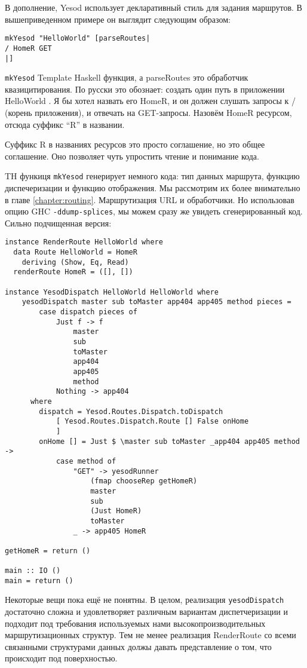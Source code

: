 В дополнение, Yesod использует декларативный стиль для задания маршрутов. 
В вышеприведенном примере он выглядит следующим образом:

\begin{lstlisting}
mkYesod "HelloWorld" [parseRoutes|
/ HomeR GET
|]
\end{lstlisting}

\lstinline'mkYesod' Template Haskell функция, а parseRoutes это 
обработчик квазицитирования. По русски это обознает: создать один 
путь в приложении HelloWorld . Я бы хотел назвать его HomeR, и он 
должен слушать запросы к / (корень приложения), 
и отвечать на GET-запросы. Назовём HomeR ресурсом, отсюда суффикс 
``R'' в названии.

Суффикс R в названиях ресурсов это просто соглашение, но это общее соглашение. 
Оно позволяет чуть упростить чтение и понимание кода.

TH функиця \lstinline'mkYesod' генерирует немного кода: тип данных маршрута, 
функцию диспечеризации и функцию отображения. Мы рассмотрим их более внимательно в главе 
\ref{chapter:routing}. Маршрутизация URL и обработчики.
Но использовав опцию GHC \lstinline'-ddump-splices', мы можем сразу же увидеть 
сгенерированный код. Сильно подчищенная версия:

\begin{lstlisting}
instance RenderRoute HelloWorld where
  data Route HelloWorld = HomeR
    deriving (Show, Eq, Read)
  renderRoute HomeR = ([], [])

instance YesodDispatch HelloWorld HelloWorld where
    yesodDispatch master sub toMaster app404 app405 method pieces =
        case dispatch pieces of
            Just f -> f
                master
                sub
                toMaster
                app404
                app405
                method
            Nothing -> app404
      where
        dispatch = Yesod.Routes.Dispatch.toDispatch
            [ Yesod.Routes.Dispatch.Route [] False onHome
            ]
        onHome [] = Just $ \master sub toMaster _app404 app405 method ->
            case method of
                "GET" -> yesodRunner
                    (fmap chooseRep getHomeR)
                    master
                    sub
                    (Just HomeR)
                    toMaster
                _ -> app405 HomeR

getHomeR = return ()

main :: IO ()
main = return ()
\end{lstlisting}

Некоторые вещи пока ещё не понятны. В целом, реализация \lstinline'yesodDispatch'
достаточно сложна и удовлетворяет различным вариантам диспетчеризации и подходит под
требования используемых нами высокопроизводительных маршрутизационных структур.
Тем не менее реализация RenderRoute со всеми связанными структурами данных должы 
давать представление о том, что происходит под поверхностью. %

